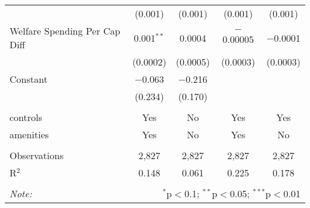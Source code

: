 \begin{table}[!htbp]
\begin{tabular}{@{\extracolsep{5pt}}lcccc}
  & (0.001) & (0.001) & (0.001) & (0.001) \\ 
  Welfare Spending Per Cap Diff & 0.001$^{**}$ & 0.0004 & $-$0.00005 & $-$0.0001 \\ 
  & (0.0002) & (0.0005) & (0.0003) & (0.0003) \\ 
  Constant & $-$0.063 & $-$0.216 &  &  \\ 
  & (0.234) & (0.170) &  &  \\ 
 \hline \\[-1.8ex] 
controls & Yes & No & Yes & Yes \\ 
amenities & Yes & No & Yes & No \\ 
\hline \\[-1.8ex] 
Observations & 2,827 & 2,827 & 2,827 & 2,827 \\ 
R$^{2}$ & 0.148 & 0.061 & 0.225 & 0.178 \\ 
\hline 
\hline \\[-1.8ex] 
\textit{Note:}  & \multicolumn{4}{r}{$^{*}$p$<$0.1; $^{**}$p$<$0.05; $^{***}$p$<$0.01} \\ 
\end{tabular} 
\end{table} 
